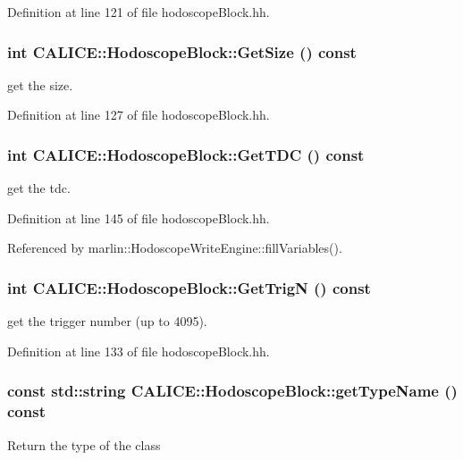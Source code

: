 Definition at line 121 of file hodoscopeBlock.hh.
\subsubsection[{GetSize}]{\setlength{\rightskip}{0pt plus 5cm}int CALICE::HodoscopeBlock::GetSize () const\hspace{0.3cm}{\ttfamily  [inline]}}\label{classCALICE_1_1HodoscopeBlock_a463e5fd470d7ee9adfe59060dd68ba58}
get the size. 

Definition at line 127 of file hodoscopeBlock.hh.
\subsubsection[{GetTDC}]{\setlength{\rightskip}{0pt plus 5cm}int CALICE::HodoscopeBlock::GetTDC () const\hspace{0.3cm}{\ttfamily  [inline]}}\label{classCALICE_1_1HodoscopeBlock_a72f2fd78f6615ac3786850eb8ad82e26}
get the tdc. 

Definition at line 145 of file hodoscopeBlock.hh.

Referenced by marlin::HodoscopeWriteEngine::fillVariables().
\subsubsection[{GetTrigN}]{\setlength{\rightskip}{0pt plus 5cm}int CALICE::HodoscopeBlock::GetTrigN () const\hspace{0.3cm}{\ttfamily  [inline]}}\label{classCALICE_1_1HodoscopeBlock_a2afa2d94a5365a3d5fb5f4e95b0ac9c7}
get the trigger number (up to 4095). 

Definition at line 133 of file hodoscopeBlock.hh.
\subsubsection[{getTypeName}]{\setlength{\rightskip}{0pt plus 5cm}const std::string CALICE::HodoscopeBlock::getTypeName () const\hspace{0.3cm}{\ttfamily  [inline]}}\label{classCALICE_1_1HodoscopeBlock_aa0c495b019c636a966c66d7078c1233f}
Return the type of the class 

